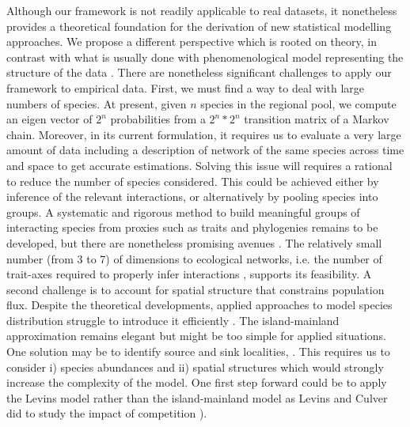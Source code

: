 Although our framework is not readily applicable to real datasets, it nonetheless provides a theoretical foundation for the derivation of new statistical modelling approaches. We propose a different perspective which is rooted on theory, in contrast with what is usually done with phenomenological model representing the structure of the data \citep{Thuiller2013Road}. There are nonetheless significant challenges to apply our framework to empirical data. First, we must find a way to deal with large numbers of species. At present, given $n$ species in the regional pool, we compute an eigen vector of $2^n$ probabilities from a $2^n*2^n$ transition matrix of a Markov chain. Moreover, in its current formulation, it requires us to evaluate a very large amount of data including a description of network of the same species across time and space to get accurate estimations. Solving this issue will requires a rational to reduce the number of species considered. This could be achieved either by inference of the relevant interactions, or alternatively by pooling species into groups. A systematic and rigorous method to build meaningful groups of interacting species from proxies such as traits and phylogenies remains to be developed, but there are nonetheless promising avenues \citep{Baskerville2011Spatial}. The relatively small number (from 3 to 7) of dimensions to ecological networks, i.e. the number of trait-axes required to properly infer interactions \citep{Ekloef2013Dimensionality}, supports its feasibility. A second challenge is to account for spatial structure that constrains population flux. Despite the theoretical developments, applied approaches to model species distribution struggle to introduce it efficiently \citep{Boulangeat2012Accounting}. The island-mainland approximation remains elegant but might be too simple for applied situations. One solution may be to identify source and sink localities, \citep{Boulangeat2012Accounting}. This requires us to consider i) species abundances and ii) spatial structures which would strongly increase the complexity of the model. One first step forward could be to apply the Levins model rather than the island-mainland model as Levins and Culver did to study the impact of competition \citep{Levins1971Regional}).

